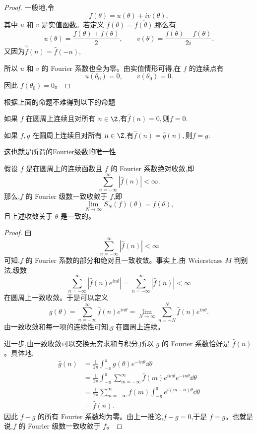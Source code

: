 \begin{proof}
	一般地,令
	\[
	f(\theta)=u(\theta)+iv(\theta),
	\]
	其中 $u$ 和 $v$ 是实值函数。若定义 $\overline f(\theta)=\overline{f(\theta)}$,那么有
	\[
	u(\theta)=\frac{f(\theta)+\overline f(\theta)}2,
	\qquad
	v(\theta)=\frac{f(\theta)-\overline f(\theta)}{2i}.
	\]
	又因为$\widehat{\overline f}(n)=\overline{\widehat f(-n)},$

	所以 $u$ 和 $v$ 的 Fourier 系数也全为零。由实值情形可得,在 $f$ 的连续点有
	\[
	u(\theta_0)=0,
	\qquad
	v(\theta_0)=0.
	\]
	因此 $f(\theta_0)=0$。
	
\end{proof}

根据上面的命题不难得到以下的命题
\begin{corollary}
	如果 $f$ 在圆周上连续且对所有 $n\in\Z$,有$\widehat f(n)=0,$则$f=0.$
	
\end{corollary}
\begin{corollary}
	如果 $f,g$ 在圆周上连续且对所有 $n\in\Z$,有$\widehat f(n)=\widehat g(n),$则$f=g.$
	
\end{corollary}
这也就是所谓的Fourier级数的唯一性

\begin{corollary}
	假设 $f$ 是在圆周上的连续函数且 $f$ 的 Fourier 系数绝对收敛,即
	\[
	\sum_{n=-\infty}^{\infty}|\widehat f(n)|<\infty.
	\]
	那么,$f$ 的 Fourier 级数一致收敛于 $f$,即
	\[
	\lim_{N\to\infty}S_N(f)(\theta)=f(\theta),
	\]
	且上述收敛关于 $\theta$ 是一致的。
\end{corollary}

\begin{proof}
由
	\[
	\sum_{n=-\infty}^{\infty}|\widehat f(n)|<\infty
	\]
	可知,$f$ 的 Fourier 系数的部分和绝对且一致收敛。事实上,由 Weierstrass $M$ 判别法,级数
	\[
	\sum_{n=-\infty}^{\infty}|\widehat f(n)e^{in\theta}| =\sum_{n=-\infty}^{\infty}|\widehat f(n)|<\infty
	\]
	在圆周上一致收敛。于是可以定义
	\[
	g(\theta)=\sum_{n=-\infty}^{\infty}\widehat f(n)e^{in\theta}
	=\lim_{N\to\infty}\sum_{n=-N}^{N}\widehat f(n)e^{in\theta}.
	\]
	由一致收敛和每一项的连续性可知,$g$ 在圆周上连续。
	
	进一步,由一致收敛可以交换无穷求和与积分,所以 $g$ 的 Fourier 系数恰好是 $\widehat f(n)$。具体地,
	\[
	\begin{aligned}
		\widehat g(n)
		&=\frac1{2\pi}\int_{-\pi}^{\pi}g(\theta)e^{-in\theta}\dd\theta                         \\
		&=\frac1{2\pi}\int_{-\pi}^{\pi}\sum_{m=-\infty}^{\infty}
		\widehat f(m)e^{im\theta}e^{-in\theta}\dd\theta                                             \\
		&=\frac1{2\pi}\sum_{m=-\infty}^{\infty}\widehat f(m)
		\int_{-\pi}^{\pi}e^{i(m-n)\theta}\dd\theta                                                   \\
		&=\widehat f(n).
	\end{aligned}
	\]
	因此 $f-g$ 的所有 Fourier 系数均为零。由上一推论,$f-g=0$,于是 $f=g$。也就是说,$f$ 的 Fourier 级数一致收敛于 $f$。
\end{proof}

